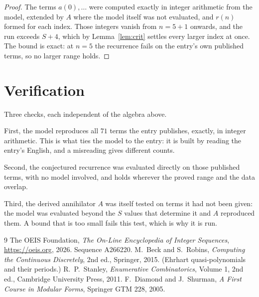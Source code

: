 \documentclass[11pt,a4paper]{article}
\theoremstyle{plain}
\theoremstyle{definition}
\begin{document}
\begin{proof}
The terms $a(0),\dots$ were computed exactly in integer arithmetic from the model, extended by
$A$ where the model itself was not evaluated, and $r(n)$ formed for each index. Those integers
vanish from $n=5+1$ onwards, and the run exceeds $S+4$, which by
Lemma~\ref{lem:crit} settles every larger index at once. The bound is exact: at $n=5$ the recurrence fails on the entry's own published terms, so no larger range holds.
\end{proof}

\section{Verification}

Three checks, each independent of the algebra above.

First, the model reproduces all $71$ terms the entry publishes, exactly, in integer
arithmetic. This is what ties the model to the entry: it is built by reading the entry's
English, and a misreading gives different counts.

Second, the conjectured recurrence was evaluated directly on those published terms, with no
model involved, and holds wherever the proved range and the data overlap.

Third, the derived annihilator $A$ was itself tested on terms it had not been given: the model
was evaluated beyond the $S$ values that determine it and $A$ reproduced them. A bound that is
too small fails this test, which is why it is run.

\begin{thebibliography}{9}
 The OEIS Foundation, \emph{The On-Line Encyclopedia of Integer
Sequences}, \url{https://oeis.org}, 2026. Sequence A266220.
 M.~Beck and S.~Robins, \emph{Computing the Continuous Discretely},
2nd ed., Springer, 2015. (Ehrhart quasi-polynomials and their periods.)
 R.~P.~Stanley, \emph{Enumerative Combinatorics}, Volume 1, 2nd ed.,
Cambridge University Press, 2011.
 F.~Diamond and J.~Shurman, \emph{A First Course in Modular Forms},
Springer GTM 228, 2005.
\end{thebibliography}
\end{document}
